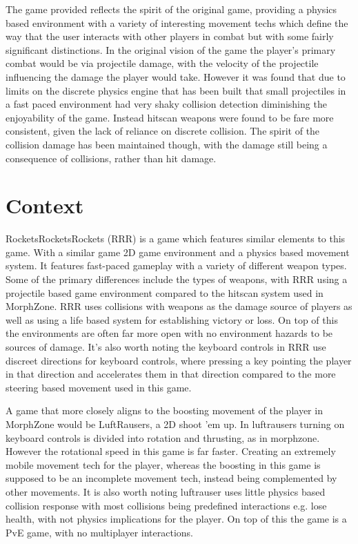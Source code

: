 \documentclass[10pt,a4paper]{article}
\begin{document}
The game provided reflects the spirit of the original game, providing a physics based environment with a variety of interesting movement techs which define the way that the user interacts with other players in combat but with some fairly significant distinctions. In the original vision of the game the player's primary combat would be via projectile damage, with the velocity of the projectile influencing the damage the player would take. However it was found that due to limits on the discrete physics engine that has been built that small projectiles in a fast paced environment had very shaky collision detection diminishing the enjoyability of the game. Instead hitscan weapons were found to be fare more consistent, given the lack of reliance on discrete collision. The spirit of the collision damage has been maintained though, with the damage still being a consequence of collisions, rather than hit damage.


\section{Context}

RocketsRocketsRockets (RRR) is a game which features similar elements to this game. With a similar game 2D game environment and a physics based movement system. It features fast-paced gameplay with a variety of different weapon types. Some of the primary differences include the types of weapons, with RRR using a projectile based game environment compared to the hitscan system used in MorphZone. RRR uses collisions with weapons as the damage source of players as well as using a life based system for establishing victory or loss. On top of this the environments are often far more open with no environment hazards to be sources of damage. It's also worth noting the keyboard controls in RRR use discreet directions for keyboard controls, where pressing a key pointing the player in that direction and accelerates them in that direction compared to the more steering based movement used in this game.

A game that more closely aligns to the boosting movement of the player in MorphZone would be LuftRausers, a 2D shoot 'em up. In luftrausers turning on keyboard controls is divided into rotation and thrusting, as in morphzone. However the rotational speed in this game is far faster. Creating an extremely mobile movement tech for the player, whereas the boosting in this game is supposed to be an incomplete movement tech, instead being complemented by other movements. It is also worth noting luftrauser uses little physics based collision response with most collisions being predefined interactions e.g. lose health, with not physics implications for the player. On top of this the game is a PvE game, with no multiplayer interactions.
\end{document}
